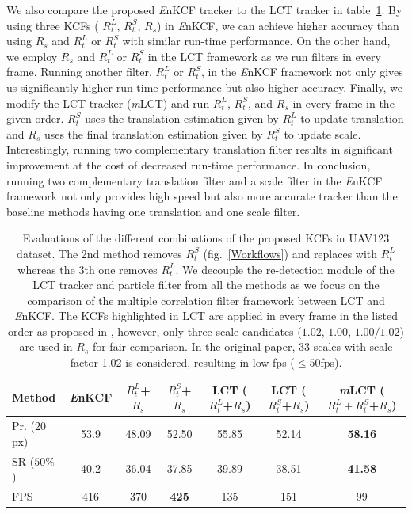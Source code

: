 \documentclass{bmvc2k}
\begin{document}
We also compare the proposed {\it E}nKCF tracker to the LCT \cite{ma2015long} tracker in table~\ref{table:Comparison_to_LCT}. 
By using three KCFs ( $R_{t}^{L}$, $R_{t}^{S}$,  $R_{s}$) in  {\it E}nKCF, we can achieve higher accuracy than using $R_{s}$ and $R_{t}^{L}$ or $R_{t}^{S}$ with similar
run-time performance. On the other hand, we employ $R_{s}$ and $R_{t}^{L}$ or $R_{t}^{S}$ in the LCT framework as we run filters in every frame. Running another filter, 
$R_{t}^{L}$ or $R_{t}^{S}$, in the {\it E}nKCF framework not only gives us significantly higher run-time performance but also higher accuracy. Finally, we modify the LCT
tracker ({\it m}LCT) and run $R_{t}^{L}$, $R_{t}^{S}$, and $R_{s}$ in every frame in the given order. $R_{t}^{S}$ uses the translation estimation given by $R_{t}^{L}$ to update
translation and $R_{s}$ uses the final translation estimation given by $R_{t}^{S}$ to update scale. Interestingly, running two complementary translation filter results in significant improvement
at the cost of decreased run-time performance. In conclusion, running two complementary translation filter and a scale filter in the {\it E}nKCF framework not only provides
high speed but also more accurate tracker than the baseline methods having one translation and one scale filter.
\begin{table}[!h]
\smaller
\begin{center}
\begin{tabular}{|l|c|c|c|c|c|c|}
\hline
Method & {\it E}nKCF & $R_{t}^{L}$+$R_{s}$ & $R_{t}^{S}$+$R_{s}$ & LCT  ($R_{t}^{L}$+$R_{s}$) & LCT  ($R_{t}^{S}$+$R_{s}$) & {\it m}LCT  ($R_{t}^{L}+R_{t}^{S}$+$R_{s}$) \\
\hline\hline
Pr. ($20$px) & 53.9 & 48.09 & 52.50 & \color{red} 55.85 & 52.14 & \textbf{58.16} \\
SR ($50\%$) & \color{red} 40.2 & 36.04 & 37.85 & 39.89 & 38.51 & \textbf{41.58} \\
FPS & \color{red} 416 & 370 & \textbf{425}  & 135 & 151 & 99 \\
\hline
\end{tabular}
\end{center}
\caption{Evaluations of the different combinations of the proposed KCFs in UAV123 dataset. The 2nd method removes $R_{t}^{S}$ (fig.~\ref{Workflows}) and replaces with $R_{t}^{L}$ whereas the 3th one removes $R_{t}^{L}$. We decouple the re-detection module of the LCT tracker and particle filter from all the methods as we focus on the comparison of the multiple correlation filter framework between LCT and  {\it E}nKCF. The KCFs highlighted in LCT are applied in every frame in the listed order as proposed in
\cite{ma2015long}, however, only three scale candidates ($1.02$, $1.00$, $1.00/1.02$) are used in $R_{s}$ for fair comparison. In the original paper, 33 scales with scale factor 1.02 is considered, resulting in low fps ($\leq50$fps).} 
\label{table:Comparison_to_LCT}
\end{table}
\end{document}
